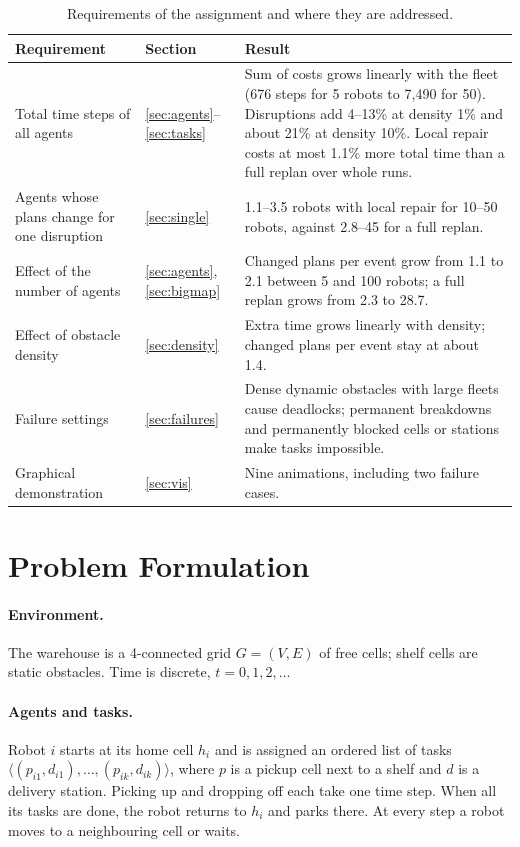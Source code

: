 \documentclass[11pt,a4paper]{article}
\begin{document}
\begin{table}[H]
\centering\small
\caption{Requirements of the assignment and where they are addressed.}
\label{tab:summary}
\begin{tabularx}{\textwidth}{@{}p{3.6cm}p{1.4cm}Y@{}}
\toprule
Requirement & Section & Result \\
\midrule
Total time steps of all agents & \ref{sec:agents}--\ref{sec:tasks} &
Sum of costs grows linearly with the fleet (676 steps for 5 robots to 7{,}490 for 50). Disruptions add
4--13\% at density 1\% and about 21\% at density 10\%. Local repair costs at most 1.1\% more total time
than a full replan over whole runs. \\
Agents whose plans change for one disruption & \ref{sec:single} &
1.1--3.5 robots with local repair for 10--50 robots, against 2.8--45 for a full replan. \\
Effect of the number of agents & \ref{sec:agents}, \ref{sec:bigmap} &
Changed plans per event grow from 1.1 to 2.1 between 5 and 100 robots; a full replan grows from 2.3 to
28.7. \\
Effect of obstacle density & \ref{sec:density} &
Extra time grows linearly with density; changed plans per event stay at about 1.4. \\
Failure settings & \ref{sec:failures} &
Dense dynamic obstacles with large fleets cause deadlocks; permanent breakdowns and permanently blocked
cells or stations make tasks impossible. \\
Graphical demonstration & \ref{sec:vis} & Nine animations, including two failure cases. \\
\bottomrule
\end{tabularx}
\end{table}

\section{Problem Formulation}

\paragraph{Environment.} The warehouse is a 4-connected grid $G=(V,E)$ of free cells; shelf cells are
static obstacles. Time is discrete, $t=0,1,2,\dots$

\paragraph{Agents and tasks.} Robot $i$ starts at its home cell $h_i$ and is assigned an ordered list
of tasks $\langle (p_{i1},d_{i1}),\dots,(p_{ik},d_{ik})\rangle$, where $p$ is a pickup cell next to a
shelf and $d$ is a delivery station. Picking up and dropping off each take one time step. When all its
tasks are done, the robot returns to $h_i$ and parks there. At every step a robot moves to a neighbouring
cell or waits.
\end{document}

